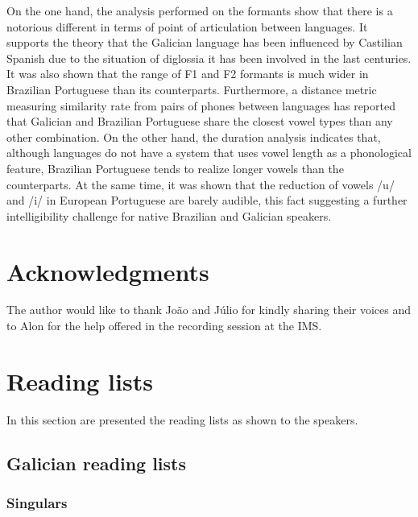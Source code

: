 \documentclass[a4paper,11pt]{article}
\begin{document}
On the one hand, the analysis performed on the formants show that there is a notorious different in terms of point of articulation between languages. It supports the theory that the Galician language has been influenced by Castilian Spanish due to the situation of diglossia it has been involved in the last centuries. It was also shown that the range of F1 and F2 formants is much wider in Brazilian Portuguese than its counterparts. Furthermore, a distance metric measuring similarity rate from pairs of phones between languages  has reported that Galician and Brazilian Portuguese share the closest vowel types than any other combination. On the other hand, the duration analysis indicates that, although languages do not have a system that uses vowel length as a phonological feature, Brazilian Portuguese tends to realize longer vowels than the counterparts. At the same time, it was shown that the reduction of vowels /u/ and /i/ in European Portuguese are barely audible, this fact suggesting a further intelligibility challenge for native Brazilian and Galician speakers.

\section{Acknowledgments}
The author would like to thank Jo\~ao and Júlio for kindly sharing their voices and to Alon for the help offered in the recording session at the IMS.




\appendix
\newpage

\section{Reading lists} \label{sec:reading-lists}
In this section are presented the reading lists as shown to the speakers.

\subsection{Galician reading lists}\label{sec:gal-reading-list}
\subsubsection*{Singulars}
\end{document}
